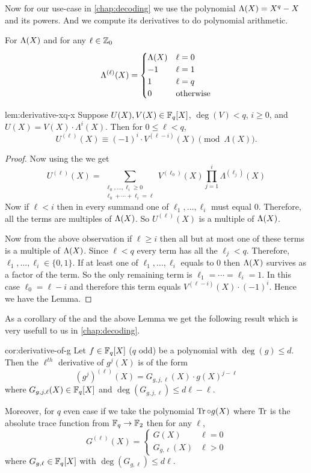 Now for our use-case in \autoref{chap:decoding} we use the polynomial $\Lambda(X)=X^q-X$ and its powers. And we compute its derivatives to do polynomial arithmetic.
\begin{observation}
  For $\Lambda(X)$ and for any $\ell\in\mathbb{Z}_0$ $$\Lambda^{(\ell)}(X)=\begin{cases}
    \Lambda(X) & \ell=0\\ -1 & \ell=1 \\ 1 & \ell =q \\ 0 & \text{otherwise}
  \end{cases}$$
\end{observation}
\begin{Lemma}{}{lem:derivative-xq-x}\label{lem:DerivativeXqX}
  Suppose $U(X), V(X) \in \mathbb{F}_q[X]$, $\deg(V) < q$, $i \geq 0$, and $U(X) = V(X)\cdot \Lambda^i(X)$. Then for $0 \leq \ell < q$,
  \[
    U^{(\ell)}(X) \equiv (-1)^i \cdot V^{(\ell-i)}(X)
    \pmod{\Lambda(X)}.
  \]
\end{Lemma}
\begin{proof}
  Now using the  we get $$U^{(\ell)}(X)=\sum_{\substack{\ell_0,\dots, \ell_i\geq 0\\ \ell_0+\cdots +\ell_i=\ell}}V^{(\ell_0)}(X)\prod_{j=1}^i \Lambda^{(\ell_j)}(X)$$Now if $\ell<i$ then in every summand one of $\ell_1,\dots, \ell_i$ must equal $0$. Therefore, all the terms are multiples of $\Lambda(X)$. So $U^{(\ell)}(X)$ is a multiple of $\Lambda(X)$.

  Now from the above observation if $\ell\geq i$ then all but at most one of these terms is a multiple of $\Lambda(X)$. Since $\ell<q$ every term has all the $\ell_j<q$. Therefore, $\ell_1,\dots, \ell_i\in\{0,1\}$. If at least one of $\ell_1,\dots,\ell_i$ equals to $0$ then $\Lambda(X)$ survives as a factor of the term. So the only remaining term is $\ell_1=\cdots =\ell_i=1$. In this case $\ell_0=\ell-i$ and therefore this term equals $V^{(\ell-i)}(X)\cdot (-1)^i$. Hence we have the Lemma.
\end{proof}
As a corollary of the  and the above Lemma we get the following result which is very usefull to us in \autoref{chap:decoding}.
\begin{corollary}{}{cor:derivative-of-g}
  Let $f\in\mathbb{F}_q[X]$ ($q$ odd) be a polynomial with $\deg(g)\leq d$. Then the $\ell^{th}$ derivative of $g^j(X)$ is of the form $$(g^j)^{(\ell)}(X)=G_{g,j,\ell}(X)\cdot g(X)^{j-\ell}$$where $G_{g,j,\ell}(X)\in\mathbb{F}_q[X]$ and $\deg(G_{g,j,\ell})\leq d\ell-\ell$.

  Moreover, for $q$ even case if we take the polynomial $\operatorname{Tr}\circ g(X)$ where $\operatorname{Tr}$ is the absolute trace function from $\mathbb{F}_q\to\mathbb{F}_2$ then for any $\ell$, $$G^{(\ell)}(X)=\begin{cases}
    G(X) & \ell=0\\ G_{g,\ell}(X) & \ell>0
  \end{cases}$$where $G_{g,\ell}\in\mathbb{F}_q[X]$ with $\deg(G_{g,\ell})\leq d\ell$.
\end{corollary}

